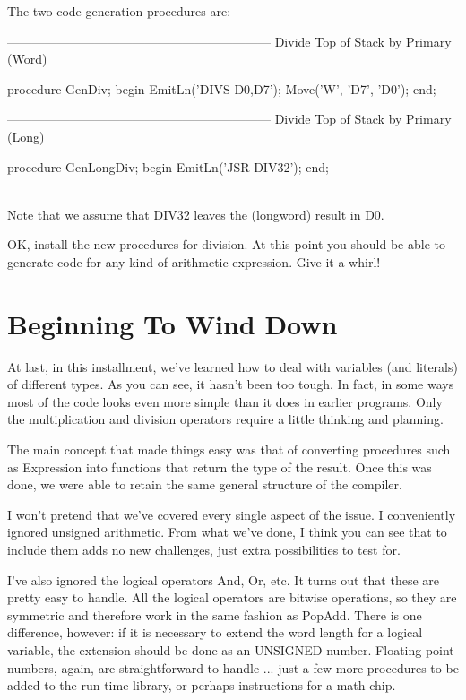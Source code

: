 \documentclass[float=false, crop=false]{standalone}
\begin{document}
The two code generation procedures are:


{---------------------------------------------------------------}
{ Divide Top of Stack by Primary  (Word) }

procedure GenDiv;
begin
   EmitLn('DIVS D0,D7');
   Move('W', 'D7', 'D0');
end;


{---------------------------------------------------------------}
{ Divide Top of Stack by Primary (Long) }

procedure GenLongDiv;
begin
   EmitLn('JSR DIV32');
end;
{---------------------------------------------------------------}


Note that we assume that DIV32 leaves the (longword) result in D0.

OK, install the new procedures for division. At this point you should be able to
generate code for any kind of arithmetic expression. Give it a whirl!


\section{Beginning To Wind Down}

At last, in this installment, we've learned how to deal with variables (and
literals) of different types. As you can see, it hasn't been too tough. In fact,
in some ways most of the code looks even more simple than it does in earlier
programs. Only the multiplication and division operators require a little
thinking and planning.

The main concept that made things easy was that of converting procedures such as
Expression into functions that return the type of the result. Once this was
done, we were able to retain the same general structure of the compiler.

I won't pretend that we've covered every single aspect of the issue. I
conveniently ignored unsigned arithmetic. From what we've done, I think you can
see that to include them adds no new challenges, just extra possibilities to
test for.

I've also ignored the logical operators And, Or, etc. It turns out that these
are pretty easy to handle. All the logical operators are bitwise operations, so
they are symmetric and therefore work in the same fashion as PopAdd. There is
one difference, however: if it is necessary to extend the word length for a
logical variable, the extension should be done as an UNSIGNED number. Floating
point numbers, again, are straightforward to handle ... just a few more
procedures to be added to the run-time library, or perhaps instructions for a
math chip.
\end{document}
